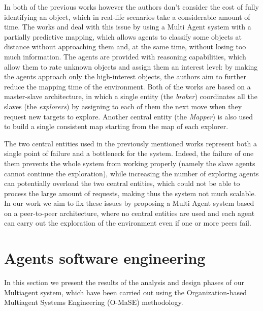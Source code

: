 \documentclass[a4paper, 10pt, conference]{ieeeconf}      %
\begin{document}
In both of the previous works however the authors don't consider the cost of fully identifying an object, which in real-life scenarios take a considerable amount of time. The works \cite{tavaresgaspar} and \cite{macedo2011uncertainty} deal with this issue by using a Multi Agent system with a partially predictive mapping, which allows agents to classify some objects at distance without approaching them and, at the same time, without losing too much information. The agents are provided with reasoning capabilities, which allow them to rate unknown objects and assign them an interest level: by making the agents approach only the high-interest objects, the authors aim to further reduce the mapping time of the environment. Both of the works are based on a master-slave architecture, in which a single entity (the \emph{broker}) coordinates all the slaves (the \emph{explorers}) by assigning to each of them the next move when they request new targets to explore. Another central entity (the \emph{Mapper}) is also used to build a single consistent map starting from the map of each explorer. 

The two central entities used in the previously mentioned works represent both a single point of failure and a bottleneck for the system. Indeed, the failure of one them prevents the whole system from working properly (namely the slave agents cannot continue the exploration), while increasing the number of exploring agents can potentially overload the two central entities, which could not be able to process the large amount of requests, making thus the system not much scalable. %
In our work we aim to fix these issues by proposing a Multi Agent system based on a peer-to-peer architecture, where no central entities are used and each agent can carry out the exploration of the environment even if one or more peers fail.  





\section{Agents software engineering}
In this section we present the results of the analysis and design phases of our Multiagent system, which have been carried out using the Organization-based Multiagent Systems Engineering (O-MaSE) \cite{deloach2005engineering} methodology. 
\end{document}
